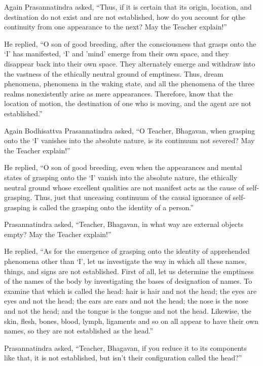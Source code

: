 \documentclass[a4paper,11pt,twoside,final]{book}
\begin{document}
Again Prasannatindra asked, ``Thus, if it is certain that its origin, location,
and destination do not exist and are not established, how do you account for
qthe continuity from one appearance to the next? May the Teacher
explain!''

He replied, ``O son of good breeding, after the consciousness that
grasps onto the `I' has manifested, `I' and 'mind' emerge from their
own space, and they disappear back into their own space. They
alternately emerge and withdraw into the vastness of the ethically
neutral ground of emptiness. Thus, dream phenomena, phenomena in the
waking state, and all the phenomena of the three realms nonexistently
arise as mere appearances. Therefore, know that the location of
motion, the destination of one who is moving, and the agent are not
established.''

Again Bodhisattva Prasannatindra asked, ``O Teacher, Bhagavan, when
grasping onto the `I' vanishes into the absolute nature, is its
continuum not severed? May the Teacher explain!''

He replied, ``O son of good breeding, even when the appearances and
mental states of grasping onto the `I' vanish into the absolute
nature, the ethically neutral ground whose excellent qualities are not
manifest acts as the cause of self-grasping. Thus, just that unceasing
continuum of the causal ignorance of self-grasping is called the
grasping onto the identity of a person.''

Prasannatindra asked, ``Teacher, Bhagavan, in what way are external
objects empty? May the Teacher explain!''

He replied, ``As for the emergence of grasping onto the identity of
apprehended phenomena other than `I', let us investigate the way in
which all these names, things, and signs are not established. First of
all, let us determine the emptiness of the names of the body by
investigating the bases of designation of names. To examine that which
is called the head: hair is hair and not the head; the eyes are eyes
and not the head; the ears are ears and not the head; the nose is the
nose and not the head; and the tongue is the tongue and not the
head. Likewise, the skin, flesh, bones, blood, lymph, ligaments and so
on all appear to have their own names, so they are not established as
the head.''

Prasannatindra asked, ``Teacher, Bhagavan, if you reduce it to its
components like that, it is not established, but isn't their
configuration called the head?''
\end{document}
